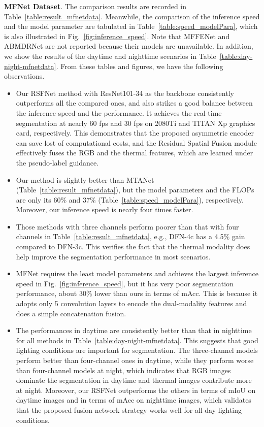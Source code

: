 \documentclass[10.5pt,twocolumn,journal,letterpaper]{IEEEtran}
\newcommand{\eg}{e.g.}
\begin{document}
\textbf{MFNet Dataset}. The comparison results are recorded in Table~\ref{table:result_mfnetdata}. Meanwhile, the comparison of the inference speed and the model parameter are tabulated in Table~\ref{table:speed_modelPara}, which is also illustrated in Fig.~\ref{fig:inference_speed}. Note that MFFENet \cite{huang-cvpr2017-densenet} and ABMDRNet \cite{zhang-cvpr2021-abmdrnet} are not reported because their models are unavailable. In addition, we show the results of the daytime and nighttime scenarios in Table~\ref{table:day-night-mfnetdata}. From these tables and figures, we have the following observations.
\begin{itemize}
	\item Our RSFNet method with ResNet101-34 as the backbone consistently outperforms all the compared ones, and also strikes a good balance between the inference speed and the performance. It achieves the real-time segmentation at nearly 60 fps and 30 fps on 2080Ti and TITAN Xp graphics card, respectively. This demonstrates that the proposed asymmetric encoder can save lost of computational costs, and the Residual Spatial Fusion module effectively fuses the RGB and the thermal features, which are learned under the pseudo-label guidance.
	
	\item Our method is slightly better than MTANet \cite{zhou-tiv2022-mtanet} (Table~\ref{table:result_mfnetdata}), but the model parameters and the FLOPs are only its 60\% and 37\% (Table~\ref{table:speed_modelPara}), respectively. Moreover, our inference speed is nearly four times faster.
	
	\item Those methods with three channels perform poorer than that with four channels in Table~\ref{table:result_mfnetdata}, \eg, DFN-4c \cite{yu-cvpr2018-dfn} has a 4.5\% gain compared to DFN-3c. This verifies the fact that the thermal modality does help improve the segmentation performance in most scenarios.
	
	\item MFNet \cite{ha-iros2017-mfnet} requires the least model parameters and achieves the largest inference speed in Fig.~\ref{fig:inference_speed}, but it has very poor segmentation performance, about 30\% lower than ours in terms of mAcc. This is because it adopts only 5 convolution layers to encode the dual-modality features and does a simple concatenation fusion.
	
	\item The performances in daytime are consistently better than that in nighttime for all methods in Table~\ref{table:day-night-mfnetdata}. This suggests that good lighting conditions are important for segmentation. The three-channel models perform better than four-channel ones in daytime, while they perform worse than four-channel models at night, which indicates that RGB images dominate the segmentation in daytime and thermal images contribute more at night. Moreover, our RSFNet outperforms the others in terms of mIoU on daytime images and in terms of mAcc on nighttime images, which validates that the proposed fusion network strategy works well for all-day lighting conditions.
		
\end{itemize}
\end{document}
